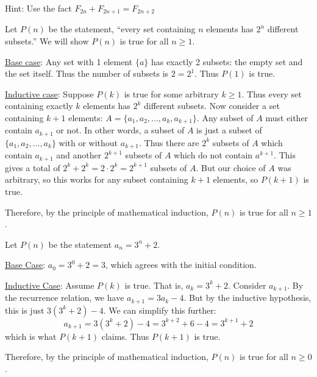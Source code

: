 \protect \documentclass [10pt]{exam}
\renewenvironment{Ans}[1]{\setcounter{question}{#1}\addtocounter{question}{-1}\question }{}
\begin{document}
\begin{questions}
\begin{Ans}{30}
  	
\end{Ans}
\begin{Ans}{31}
      Hint: Use the fact $F_{2n} + F_{2n+1} = F_{2n+2}$
  	
\end{Ans}
\begin{Ans}{32}
  		Let $P(n)$ be the statement, ``every set containing $n$ elements has $2^n$ different subsets.''  We will show $P(n)$ is true for all $n \ge 1$.

  		\underline{Base case}: Any set with 1 element $\{a\}$ has exactly 2 subsets: the empty set and the set itself.  Thus the number of subsets is $2= 2^1$.  Thus $P(1)$ is true.

  		\underline{Inductive case}: Suppose $P(k)$ is true for some arbitrary $k \ge 1$.  Thus every set containing exactly $k$ elements has $2^k$ different subsets.  Now consider a set containing $k+1$ elements: $A = \{a_1, a_2, \ldots, a_k, a_{k+1}\}$.  Any subset of $A$ must either contain $a_{k+1}$ or not.  In other words, a subset of $A$ is just a subset of $\{a_1, a_2,\ldots, a_k\}$ with or without $a_{k+1}$.  Thus there are $2^k$ subsets of $A$ which contain $a_{k+1}$ and another $2^{k+1}$ subsets of $A$ which do not contain $a^{k+1}$.  This gives a total of $2^k + 2^k = 2\cdot 2^k = 2^{k+1}$ subsets of $A$.  But our choice of $A$ was arbitrary, so this works for any subset containing $k+1$ elements, so $P(k+1)$ is true.

  		Therefore, by the principle of mathematical induction, $P(n)$ is true for all $n \ge 1$.
  	
\end{Ans}
\begin{Ans}{33}
      Let $P(n)$ be the statement $a_n = 3^n + 2$.

      \underline{Base Case}: $a_0 = 3^0 + 2 = 3$, which agrees with the initial condition.

      \underline{Inductive Case}:  Assume $P(k)$ is true.  That is, $a_k = 3^k + 2$.  Consider $a_{k+1}$.  By the recurrence relation, we have $a_{k+1} = 3a_k - 4$.  But by the inductive hypothesis, this is just $3(3^k+2) - 4$.  We can simplify this further:
      \[ a_{k+1} = 3(3^k+2) - 4 = 3^{k+2} + 6 - 4 = 3^{k+1} +2\]
      which is what $P(k+1)$ claims.  Thus $P(k+1)$ is true.

      Therefore, by the principle of mathematical induction, $P(n)$ is true for all $n \ge 0$.
    
\end{Ans}
 \protect \end {questions} \par \protect 
\end{document}
